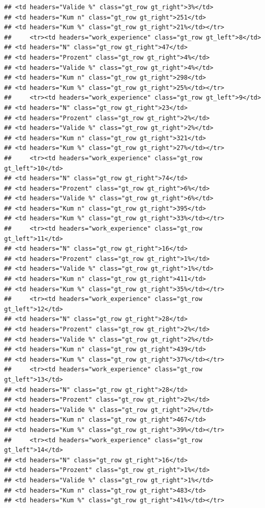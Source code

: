 \documentclass[
  a4paper,
  DIV=11,
  numbers=noendperiod]{scrartcl}
\begin{document}
\begin{verbatim}
## <td headers="Valide %" class="gt_row gt_right">3%</td>
## <td headers="Kum n" class="gt_row gt_right">251</td>
## <td headers="Kum %" class="gt_row gt_right">21%</td></tr>
##     <tr><td headers="work_experience" class="gt_row gt_left">8</td>
## <td headers="N" class="gt_row gt_right">47</td>
## <td headers="Prozent" class="gt_row gt_right">4%</td>
## <td headers="Valide %" class="gt_row gt_right">4%</td>
## <td headers="Kum n" class="gt_row gt_right">298</td>
## <td headers="Kum %" class="gt_row gt_right">25%</td></tr>
##     <tr><td headers="work_experience" class="gt_row gt_left">9</td>
## <td headers="N" class="gt_row gt_right">23</td>
## <td headers="Prozent" class="gt_row gt_right">2%</td>
## <td headers="Valide %" class="gt_row gt_right">2%</td>
## <td headers="Kum n" class="gt_row gt_right">321</td>
## <td headers="Kum %" class="gt_row gt_right">27%</td></tr>
##     <tr><td headers="work_experience" class="gt_row gt_left">10</td>
## <td headers="N" class="gt_row gt_right">74</td>
## <td headers="Prozent" class="gt_row gt_right">6%</td>
## <td headers="Valide %" class="gt_row gt_right">6%</td>
## <td headers="Kum n" class="gt_row gt_right">395</td>
## <td headers="Kum %" class="gt_row gt_right">33%</td></tr>
##     <tr><td headers="work_experience" class="gt_row gt_left">11</td>
## <td headers="N" class="gt_row gt_right">16</td>
## <td headers="Prozent" class="gt_row gt_right">1%</td>
## <td headers="Valide %" class="gt_row gt_right">1%</td>
## <td headers="Kum n" class="gt_row gt_right">411</td>
## <td headers="Kum %" class="gt_row gt_right">35%</td></tr>
##     <tr><td headers="work_experience" class="gt_row gt_left">12</td>
## <td headers="N" class="gt_row gt_right">28</td>
## <td headers="Prozent" class="gt_row gt_right">2%</td>
## <td headers="Valide %" class="gt_row gt_right">2%</td>
## <td headers="Kum n" class="gt_row gt_right">439</td>
## <td headers="Kum %" class="gt_row gt_right">37%</td></tr>
##     <tr><td headers="work_experience" class="gt_row gt_left">13</td>
## <td headers="N" class="gt_row gt_right">28</td>
## <td headers="Prozent" class="gt_row gt_right">2%</td>
## <td headers="Valide %" class="gt_row gt_right">2%</td>
## <td headers="Kum n" class="gt_row gt_right">467</td>
## <td headers="Kum %" class="gt_row gt_right">39%</td></tr>
##     <tr><td headers="work_experience" class="gt_row gt_left">14</td>
## <td headers="N" class="gt_row gt_right">16</td>
## <td headers="Prozent" class="gt_row gt_right">1%</td>
## <td headers="Valide %" class="gt_row gt_right">1%</td>
## <td headers="Kum n" class="gt_row gt_right">483</td>
## <td headers="Kum %" class="gt_row gt_right">41%</td></tr>

\end{verbatim}
\end{document}
